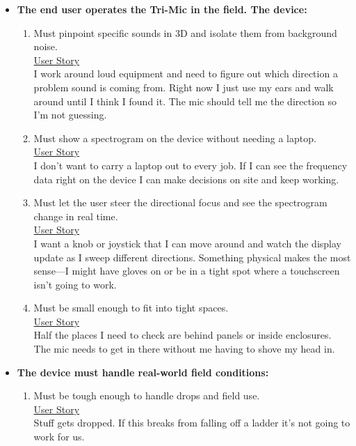 \begin{itemize}
	\item \textbf{The end user operates the Tri-Mic in the field.  The device:}
	\begin{enumerate}
		\item Must pinpoint specific sounds in 3D and isolate them from background noise.\\ [.5cm] \underline{User Story}\\
		I work around loud equipment and need to figure out which direction a problem sound is coming from.  Right now I just use my ears and walk around until I think I found it.  The mic should tell me the direction so I'm not guessing.
		\bigskip

		\item Must show a spectrogram on the device without needing a laptop.\\ [.5cm] \underline{User Story}\\
		I don't want to carry a laptop out to every job.  If I can see the frequency data right on the device I can make decisions on site and keep working.
		\bigskip

		\item Must let the user steer the directional focus and see the spectrogram change in real time.\\ [.5cm] \underline{User Story}\\
		I want a knob or joystick that I can move around and watch the display update as I sweep different directions.  Something physical makes the most sense---I might have gloves on or be in a tight spot where a touchscreen isn't going to work.
		\bigskip

		\item Must be small enough to fit into tight spaces.\\ [.5cm] \underline{User Story}\\
		Half the places I need to check are behind panels or inside enclosures.  The mic needs to get in there without me having to shove my head in.
		\bigskip
	\end{enumerate}

	\item \textbf{The device must handle real-world field conditions:}
	\begin{enumerate}
		\item Must be tough enough to handle drops and field use.\\ [.5cm] \underline{User Story}\\
		Stuff gets dropped.  If this breaks from falling off a ladder it's not going to work for us.
		\bigskip


\end{enumerate}
\end{itemize}
